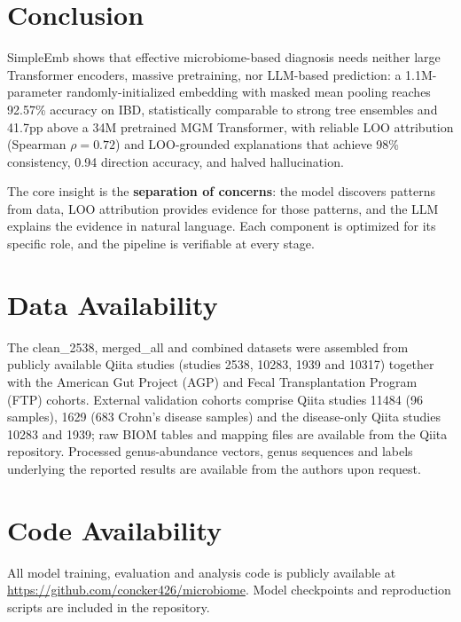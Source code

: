 \documentclass{article} %
\begin{document}
\section{Conclusion}

SimpleEmb shows that effective microbiome-based diagnosis needs neither large Transformer encoders, massive pretraining, nor LLM-based prediction: a 1.1M-parameter randomly-initialized embedding with masked mean pooling reaches 92.57\% accuracy on IBD, statistically comparable to strong tree ensembles and 41.7pp above a 34M pretrained MGM Transformer, with reliable LOO attribution (Spearman $\rho{=}0.72$) and LOO-grounded explanations that achieve 98\% consistency, 0.94 direction accuracy, and halved hallucination.

The core insight is the \textbf{separation of concerns}: the model discovers patterns from data, LOO attribution provides evidence for those patterns, and the LLM explains the evidence in natural language. Each component is optimized for its specific role, and the pipeline is verifiable at every stage.






\section*{Data Availability}
The clean\_2538, merged\_all and combined datasets were assembled from publicly available Qiita studies (studies 2538, 10283, 1939 and 10317) together with the American Gut Project (AGP) and Fecal Transplantation Program (FTP) cohorts. External validation cohorts comprise Qiita studies 11484 (96 samples), 1629 (683 Crohn’s disease samples) and the disease-only Qiita studies 10283 and 1939; raw BIOM tables and mapping files are available from the Qiita repository. Processed genus-abundance vectors, genus sequences and labels underlying the reported results are available from the authors upon request.

\section*{Code Availability}
All model training, evaluation and analysis code is publicly available at \url{https://github.com/concker426/microbiome}. Model checkpoints and reproduction scripts are included in the repository.
\end{document}
